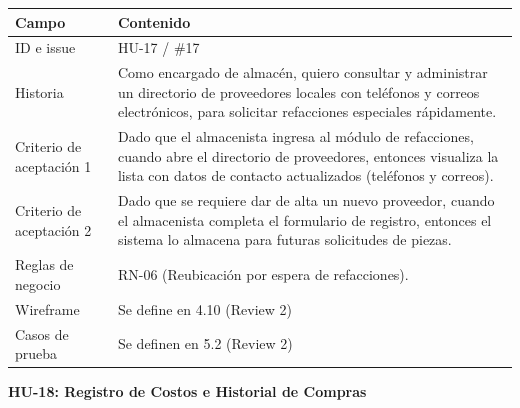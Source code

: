 {\def\LTcaptype{none} %
\begin{longtable}[]{@{}
  >{\raggedright\arraybackslash}p{}
  >{\raggedright\arraybackslash}p{}@{}}
\toprule\noalign{}
\begin{minipage}[b]{\linewidth}\raggedright
\textbf{Campo}
\end{minipage} & \begin{minipage}[b]{\linewidth}\raggedright
\textbf{Contenido}
\end{minipage} \\
\midrule\noalign{}
\endhead
\bottomrule\noalign{}
\endlastfoot
ID e issue & HU-17 / \#17 \\
Historia & Como encargado de almacén, quiero consultar y administrar un
directorio de proveedores locales con teléfonos y correos electrónicos,
para solicitar refacciones especiales rápidamente. \\
Criterio de aceptación 1 & Dado que el almacenista ingresa al módulo de
refacciones, cuando abre el directorio de proveedores, entonces
visualiza la lista con datos de contacto actualizados (teléfonos y
correos). \\
Criterio de aceptación 2 & Dado que se requiere dar de alta un nuevo
proveedor, cuando el almacenista completa el formulario de registro,
entonces el sistema lo almacena para futuras solicitudes de piezas. \\
Reglas de negocio & RN-06 (Reubicación por espera de refacciones). \\
Wireframe & Se define en 4.10 (Review 2) \\
Casos de prueba & Se definen en 5.2 (Review 2) \\
\end{longtable}
}

\textbf{HU-18: Registro de Costos e Historial de Compras}

